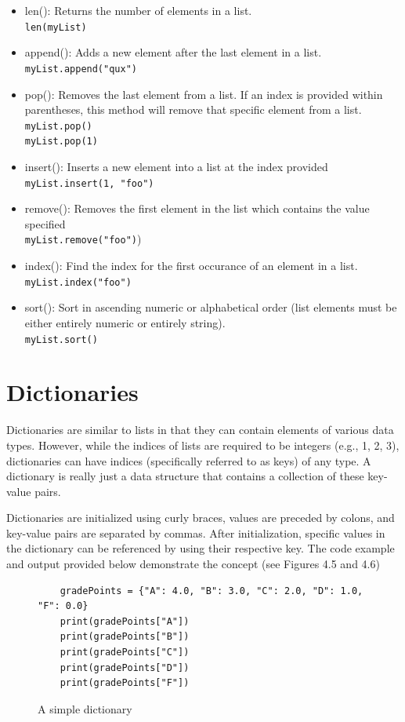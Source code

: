 \documentclass{book}
\begin{document}
\begin{itemize}
	\item len(): Returns the number of elements in a list.
	\\ \texttt{len(myList)}
	\item append(): Adds a new element after the last element in a list.
	\\ \texttt{myList.append("qux")}
	\item pop(): Removes the last element from a list. If an index is provided within parentheses, this method will remove that specific element from a list.
	\\ \texttt{myList.pop() \\ myList.pop(1)}
	\item insert(): Inserts a new element into a list at the index provided 
	\\ \texttt{myList.insert(1, "foo")}
	\item remove(): Removes the first element in the list which contains the value specified 
	\\ \texttt{myList.remove("foo")})
	\item index(): Find the index for the first occurance of an element in a list.
	\\ \texttt{myList.index("foo")}
	\item sort(): Sort in ascending numeric or alphabetical order (list elements must be either entirely numeric or entirely string).
	\\ \texttt{myList.sort()}
\end{itemize}

\section{Dictionaries}
Dictionaries are similar to lists in that they can contain elements of various data types. However, while the indices of lists are required to be integers (e.g., 1, 2, 3), dictionaries can have indices (specifically referred to as keys) of any type. A dictionary is really just a data structure that contains a collection of these key-value pairs. 

Dictionaries are initialized using curly braces, values are preceded by colons, and key-value pairs are separated by commas. After initialization, specific values in the dictionary can be referenced by using their respective key. The code example and output provided below demonstrate the concept (see Figures 4.5 and 4.6)

\begin{figure}[h]
	\caption{A simple dictionary}
	\begin{lstlisting}
	gradePoints = {"A": 4.0, "B": 3.0, "C": 2.0, "D": 1.0, "F": 0.0}
	print(gradePoints["A"])
	print(gradePoints["B"])
	print(gradePoints["C"])
	print(gradePoints["D"])
	print(gradePoints["F"])
	\end{lstlisting}
\end{figure}
\end{document}
